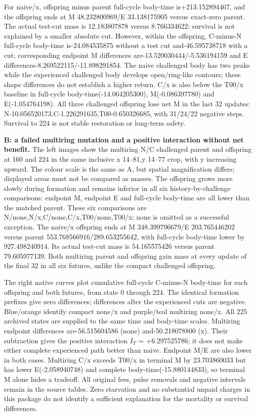 For naive/x, offspring minus parent full-cycle body-time is+213.152894467, and the offspring ends at M 48.232800969/E 33.138175905 versus exact-zero parent. The actual test-cut mass is 12.183807878 versus 8.766334622: survival is not explained by a smaller absolute cut. However, within the offspring, C-minus-N full-cycle body-time is-24.084535875 without a test cut and-46.595738718 with a cut; corresponding endpoint M differences are-13.520030444/-5.536194159 and E differences-8.269522115/-11.898291854. The naive challenged body has two peaks while the experienced challenged body develops open/ring-like contours; these shape differences do not establish a higher return. C/x is also below the T00/x baseline in full-cycle body-time(-14.064205300), M(-0.086397780) and E(-1.054764198). All three challenged offspring lose net M in the last 32 updates: N-10.056520173,C-1.226291635,T00-0.650326685, with 31/24/22 negative steps. Survival to 224 is not stable restoration or long-term safety.

\textbf{B: a failed multiring mutation and a positive interaction without net benefit.} The left images show the multiring N/C challenged parent and offspring at 160 and 224 in the same inclusive x 14--81,y 14--77 crop, with y increasing upward. The colour scale is the same as A, but spatial magnification differs; displayed areas must not be compared as masses. The offspring grows more slowly during formation and remains inferior in all six history-by-challenge comparisons: endpoint M, endpoint E and full-cycle body-time are all lower than the matched parent. These six comparisons are N/none,N/x,C/none,C/x,T00/none,T00/x; none is omitted as a successful exception. The naive/x offspring ends at M 348.399796679/E 203.765446202 versus parent 553.768566916/289.653255642, with full-cycle body-time lower by 927.498240914. Its actual test-cut mass is 54.165575426 versus parent 79.605977139. Both multiring parent and offspring gain mass at every update of the final 32 in all six futures, unlike the compact challenged offspring.

The right native curves plot cumulative full-cycle C-minus-N body-time for each offspring and both futures, from state 0 through 224. The identical formation prefixes give zero differences; differences after the experienced cuts are negative. Blue/orange identify compact none/x and purple/teal multiring none/x. All 225 archived states are supplied to the same time and body-time scales. Multiring endpoint differences are-56.515604586 (none) and-50.218078800 (x). Their subtraction gives the positive interaction  $I_T$ = +6.297525786; it does not make either complete experienced path better than naive. Endpoint M/E are also lower in both cases. Multiring C/x exceeds T00/x in terminal M by 23.703860033 but has lower E(-2.058940748) and complete body-time(-15.880144833), so terminal M alone hides a tradeoff. All original fees, pulse removals and negative intervals remain in the source tables. Zero starvation and no substantial unpaid charges in this package do not identify a sufficient explanation for the mortality or survival differences.

